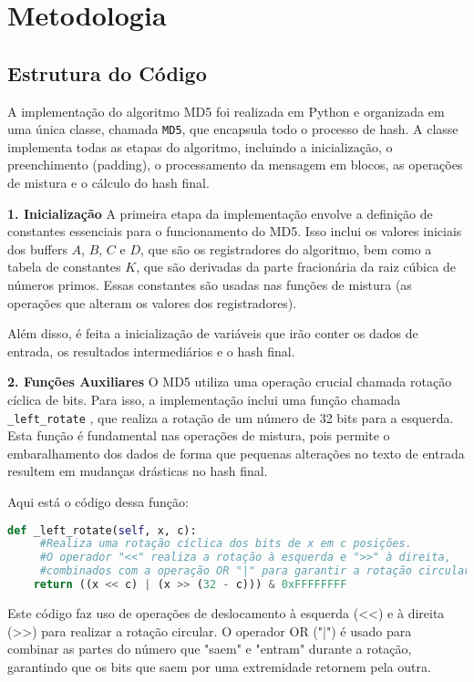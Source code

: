 \documentclass{article}
\begin{document}
\section{Metodologia}
\subsection{Estrutura do Código}
A implementação do algoritmo MD5 foi realizada em Python e organizada em uma única classe, chamada \texttt{MD5}, que encapsula todo o processo de hash. A classe implementa todas as etapas do algoritmo, incluindo a inicialização, o preenchimento (padding), o processamento da mensagem em blocos, as operações de mistura e o cálculo do hash final.

\textbf{1. Inicialização} A primeira etapa da implementação envolve a definição de constantes essenciais para o funcionamento do MD5. Isso inclui os valores iniciais dos buffers $A$, $B$, $C$ e $D$, que são os registradores do algoritmo, bem como a tabela de constantes $K$, que são derivadas da parte fracionária da raiz cúbica de números primos. Essas constantes são usadas nas funções de mistura (as operações que alteram os valores dos registradores).

Além disso, é feita a inicialização de variáveis que irão conter os dados de entrada, os resultados intermediários e o hash final.

\textbf{2. Funções Auxiliares} 
O MD5 utiliza uma operação crucial chamada rotação cíclica de bits. Para isso, a implementação inclui uma função chamada \texttt{\_left\_rotate}
, que realiza a rotação de um número de 32 bits para a esquerda. Esta função é fundamental nas operações de mistura, pois permite o embaralhamento dos dados de forma que pequenas alterações no texto de entrada resultem em mudanças drásticas no hash final.

Aqui está o código dessa função:

\begin{lstlisting}[language=Python]
def _left_rotate(self, x, c):
     #Realiza uma rotação cíclica dos bits de x em c posições.
     #O operador "<<" realiza a rotação à esquerda e ">>" à direita,
     #combinados com a operação OR "|" para garantir a rotação circular.
    return ((x << c) | (x >> (32 - c))) & 0xFFFFFFFF
\end{lstlisting}

Este código faz uso de operações de deslocamento à esquerda (<<) e à direita (>>) para realizar a rotação circular. O operador OR ("|") é usado para combinar as partes do número que "saem" e "entram" durante a rotação, garantindo que os bits que saem por uma extremidade retornem pela outra.
\end{document}
